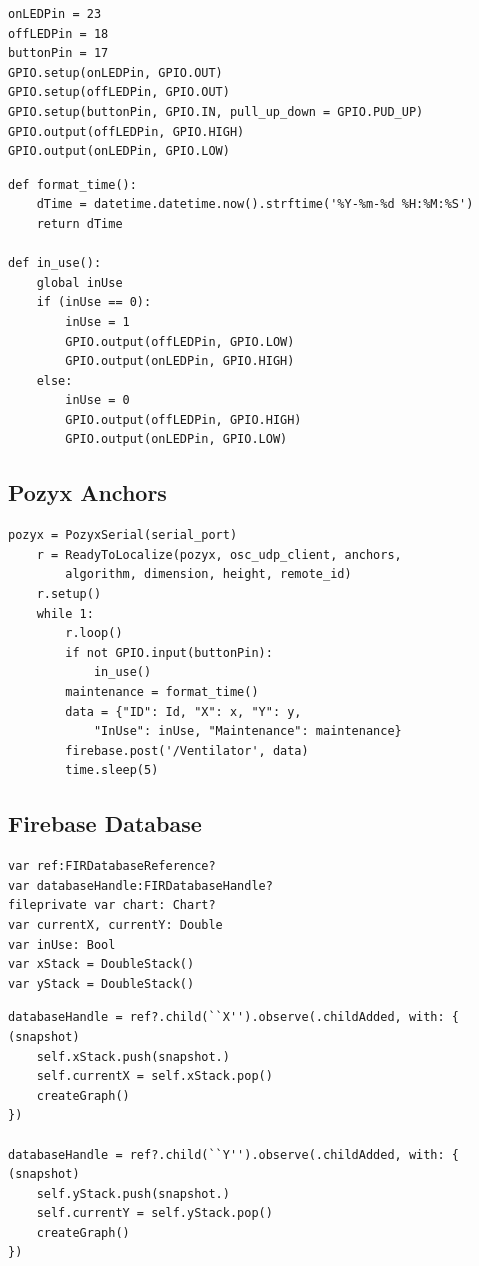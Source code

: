 \documentclass[12pt]{article}
\begin{document}
		\begin{Verbatim}[fontsize=\small]
onLEDPin = 23
offLEDPin = 18
buttonPin = 17
GPIO.setup(onLEDPin, GPIO.OUT)
GPIO.setup(offLEDPin, GPIO.OUT)
GPIO.setup(buttonPin, GPIO.IN, pull_up_down = GPIO.PUD_UP)
GPIO.output(offLEDPin, GPIO.HIGH)
GPIO.output(onLEDPin, GPIO.LOW)
		\end{Verbatim}

		\begin{Verbatim}[fontsize=\small]
def format_time():
    dTime = datetime.datetime.now().strftime('%Y-%m-%d %H:%M:%S')
    return dTime

def in_use():
    global inUse
    if (inUse == 0):
        inUse = 1
        GPIO.output(offLEDPin, GPIO.LOW)
        GPIO.output(onLEDPin, GPIO.HIGH)
    else:
        inUse = 0
        GPIO.output(offLEDPin, GPIO.HIGH)
        GPIO.output(onLEDPin, GPIO.LOW)
		\end{Verbatim}

	\subsection{Pozyx Anchors}
		\begin{Verbatim}[fontsize=\small]
pozyx = PozyxSerial(serial_port)
    r = ReadyToLocalize(pozyx, osc_udp_client, anchors,
    	algorithm, dimension, height, remote_id)
    r.setup()
    while 1:
        r.loop()
        if not GPIO.input(buttonPin):
            in_use()
        maintenance = format_time()
        data = {"ID": Id, "X": x, "Y": y,
        	"InUse": inUse, "Maintenance": maintenance}
        firebase.post('/Ventilator', data)
        time.sleep(5)
		\end{Verbatim}

	\subsection{Firebase Database}
		\begin{Verbatim}[fontsize=\small]
var ref:FIRDatabaseReference?
var databaseHandle:FIRDatabaseHandle?
fileprivate var chart: Chart?
var currentX, currentY: Double
var inUse: Bool
var xStack = DoubleStack()
var yStack = DoubleStack()
		\end{Verbatim}

		\begin{Verbatim}[fontsize=\small]
databaseHandle = ref?.child(``X'').observe(.childAdded, with: { (snapshot)
	self.xStack.push(snapshot.)
	self.currentX = self.xStack.pop()
	createGraph()
})

databaseHandle = ref?.child(``Y'').observe(.childAdded, with: { (snapshot)
	self.yStack.push(snapshot.)
	self.currentY = self.yStack.pop()
	createGraph()
})
		\end{Verbatim}
\end{document}
